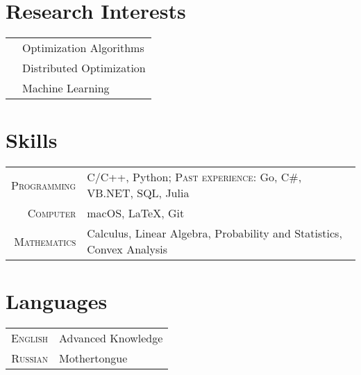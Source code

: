 \documentclass[a4paper,10pt]{article} %
\begin{document}
\section{Research Interests}
\begin{tabular}{cl}
\qquad\qquad&  Optimization Algorithms\\
&  Distributed Optimization\\
&  Machine Learning
\end{tabular}

\section{Skills}

\begin{tabular}{rl}
	\textsc{Programming} & C/C++, Python; \textsc{Past experience:} Go, C\#, VB.NET, SQL, Julia\\
	\textsc{Computer} & macOS, LaTeX, Git\\
	\textsc{Mathematics} & Calculus, Linear Algebra, Probability and Statistics, Convex Analysis\\
\end{tabular}

\section{Languages}

\begin{tabular}{rl}
	\textsc{English} & Advanced Knowledge \\
	\textsc{Russian} & Mothertongue\\
\end{tabular}












\end{document}

